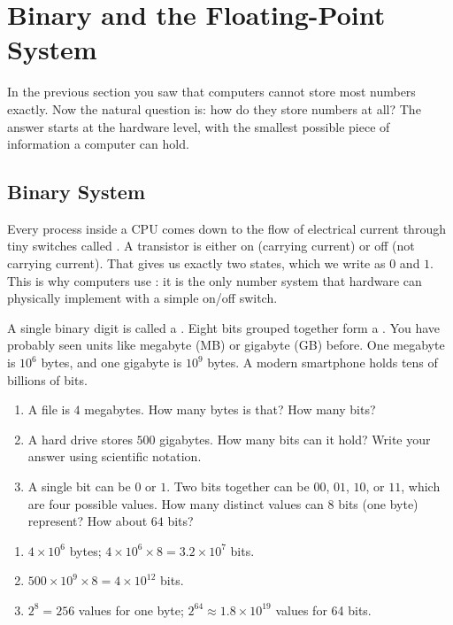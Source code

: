 \section{Binary and the Floating-Point System}

In the previous section you saw that computers cannot store most numbers
exactly.
Now the natural question is: how do they store numbers at all?
The answer starts at the hardware level, with the smallest possible piece of
information a computer can hold.

\subsection{Binary System}

Every process inside a CPU comes down to the flow of electrical current through
tiny switches called .
A transistor is either on (carrying current) or off (not carrying current).
That gives us exactly two states, which we write as $0$ and $1$.
This is why computers use : it is the only number
system that hardware can physically implement with a simple on/off switch.

A single binary digit is called a .
Eight bits grouped together form a .
You have probably seen units like megabyte (MB) or gigabyte (GB) before.
One megabyte is $10^6$ bytes, and one gigabyte is $10^9$ bytes.
A modern smartphone holds tens of billions of bits.

\begin{Exercise}[title={Bits and bytes}, label={ex:bits-bytes}]
  \begin{enumerate}
    \item A file is $4$ megabytes.
          How many bytes is that?
          How many bits?
    \item A hard drive stores $500$ gigabytes.
          How many bits can it hold?
          Write your answer using scientific notation.
    \item A single bit can be $0$ or $1$.
          Two bits together can be $00$, $01$, $10$, or $11$, which are four possible
          values.
          How many distinct values can $8$ bits (one byte) represent?
          How about $64$ bits?
  \end{enumerate}
\end{Exercise}
\begin{Answer}[ref={ex:bits-bytes}]
  \begin{enumerate}
    \item $4 \times 10^6$ bytes;\; $4 \times 10^6 \times 8 = 3.2 \times 10^7$
          bits.
    \item $500 \times 10^9 \times 8 = 4 \times 10^{12}$ bits.
    \item $2^8 = 256$ values for one byte;\;
          $2^{64} \approx 1.8 \times 10^{19}$ values for 64 bits.
  \end{enumerate}
\end{Answer}


